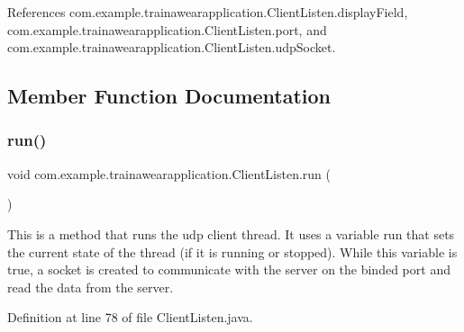 References com.\+example.\+trainawearapplication.\+Client\+Listen.\+display\+Field, com.\+example.\+trainawearapplication.\+Client\+Listen.\+port, and com.\+example.\+trainawearapplication.\+Client\+Listen.\+udp\+Socket.



\subsection{Member Function Documentation}
\mbox{\label{classcom_1_1example_1_1trainawearapplication_1_1_client_listen_adcb69d9825d6d9e182905cf9b4aa4d7d}} 
\subsubsection{\texorpdfstring{run()}{run()}}
{\footnotesize\ttfamily void com.\+example.\+trainawearapplication.\+Client\+Listen.\+run (\begin{DoxyParamCaption}{ }\end{DoxyParamCaption})}

This is a method that runs the udp client thread. It uses a variable run that sets the current state of the thread (if it is running or stopped). While this variable is true, a socket is created to communicate with the server on the binded port and read the data from the server.

Definition at line 78 of file Client\+Listen.\+java.


